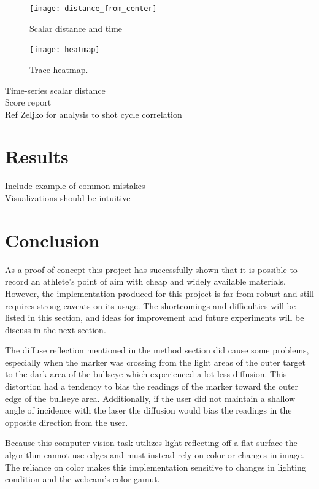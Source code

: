 \documentclass[conference]{IEEEtran}
\begin{document}
\begin{figure}[]
	\centering
	\texttt{[image: distance\_from\_center]}
	\caption{Scalar distance and time}
	\label{fig:dfc}
\end{figure}


\begin{figure}[]
	\centering
	\texttt{[image: heatmap]}
	\caption{Trace heatmap.}
	\label{fig:heatmap}
\end{figure}



\textlangle Time-series scalar distance \textrangle \\
\textlangle Score report \textrangle \\
\textlangle Ref Zeljko for analysis to shot cycle correlation \textrangle

\section{Results}

\noindent
\textlangle Include example of common mistakes \textrangle \\
\textlangle Visualizations should be intuitive \textrangle

\section{Conclusion}

As a proof-of-concept this project has successfully shown that it is possible to record an athlete's point of aim with cheap and widely available materials.
However, the implementation produced for this project is far from robust and still requires strong caveats on its usage.
The shortcomings and difficulties will be listed in this section, 
and ideas for improvement and future experiments will be discuss in the next section.

The diffuse reflection mentioned in the method section did cause some problems, especially when the marker was crossing from the light areas of the outer target to the dark area of the bullseye which experienced a lot less diffusion.
This distortion had a tendency to bias the readings of the marker toward the outer edge of the bullseye area.
Additionally, if the user did not maintain a shallow angle of incidence with the laser the diffusion would bias the readings in the opposite direction from the user.

Because this computer vision task utilizes light reflecting off a flat surface the algorithm cannot use edges and must instead rely on color or changes in image.
The reliance on color makes this implementation sensitive to changes in lighting condition and the webcam's color gamut.
\end{document}

